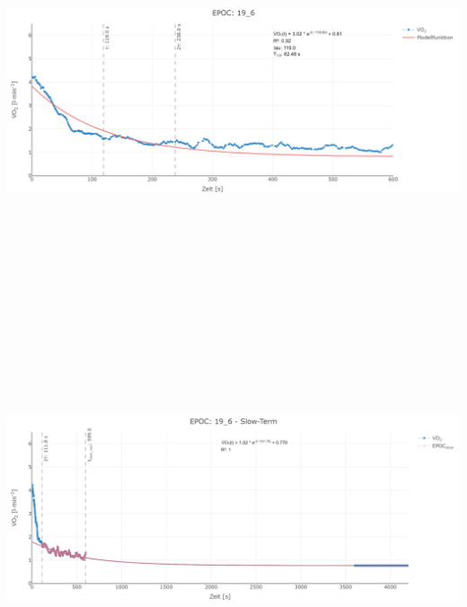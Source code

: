 \documentclass[
  letterpaper,
  DIV=11]{scrartcl}
\begin{document}
\includegraphics[width=11.45833in,height=4.6875in]{images/19_6_tau.png}
\includegraphics[width=11.45833in,height=4.6875in]{images/19_6_slow.png}
\end{document}
